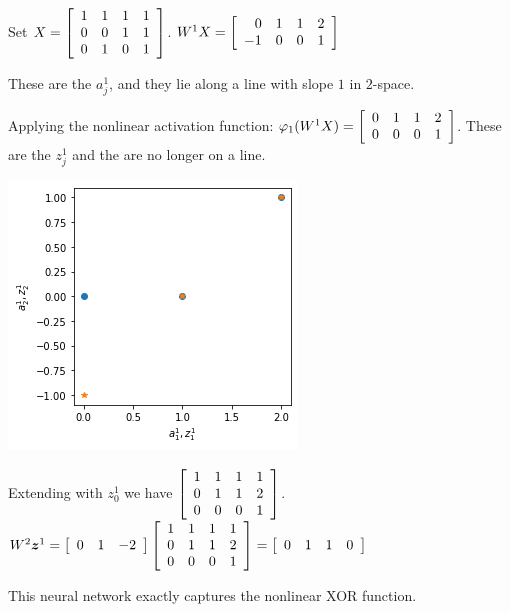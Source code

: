 \documentclass[12pt,letterpaper,noanswers]{exam}
\newcommand{\vc}[1]{\boldsymbol{#1}}
\newcommand{\note}[1]{{#1}} %
\begin{document}
\note{
\noindent  Set $X = \left[\begin{array}{r r r r} 1 & 1 & 1 & 1 \\
0 & 0 & 1 & 1 \\
0 & 1 & 0 & 1\end{array}\right]$.  $W^1X = \left[\begin{array}{r r r r}
0 & 1 & 1 & 2 \\
-1 & 0 & 0 & 1\end{array}\right]$

\noindent  These are the $a_j^1$, and they lie along a line with slope $1$ in $2$-space.

\noindent  Applying the nonlinear activation function:
$\varphi_1(W^1X) = \left[\begin{array}{r r r r}
0 & 1 & 1 & 2 \\
0 & 0 & 0 & 1\end{array}\right]$.  These are the $z_j^1$ and the are no longer on a line.

\includegraphics[scale=0.5]{img/C22az.png}

\noindent  Extending with $z_0^1$ we have $\left[\begin{array}{r r r r}
1 & 1 & 1 & 1\\
0 & 1 & 1 & 2 \\
0 & 0 & 0 & 1\end{array}\right]$.  $W^2\vc{z}^1 = \left[\begin{array}{r r r} 0 & 1 & -2\end{array}\right]\left[\begin{array}{r r r r}
1 & 1 & 1 & 1\\
0 & 1 & 1 & 2 \\
0 & 0 & 0 & 1\end{array}\right] = \left[\begin{array}{r r r r} 
0 & 1 & 1 & 0
\end{array}\right]$

\noindent  This neural network exactly captures the nonlinear XOR function.
}
\end{document}
